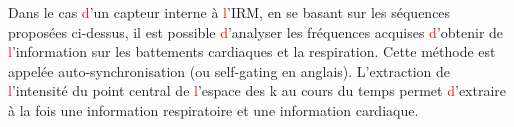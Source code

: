 Dans le cas \textcolor{red}{d}’un capteur interne à \textcolor{red}{l}’IRM, en se basant sur les séquences proposées ci-dessus, il est possible \textcolor{red}{d}’analyser les fréquences acquises \textcolor{red}{d}’obtenir de \textcolor{red}{l}’information sur les battements cardiaques et la respiration. Cette méthode est appelée auto-synchronisation (ou self-gating en anglais). L’extraction de \textcolor{red}{l}’intensité du point central de \textcolor{red}{l}’espace des k au cours du temps permet \textcolor{red}{d}’extraire à la fois une information respiratoire et une information cardiaque.\\